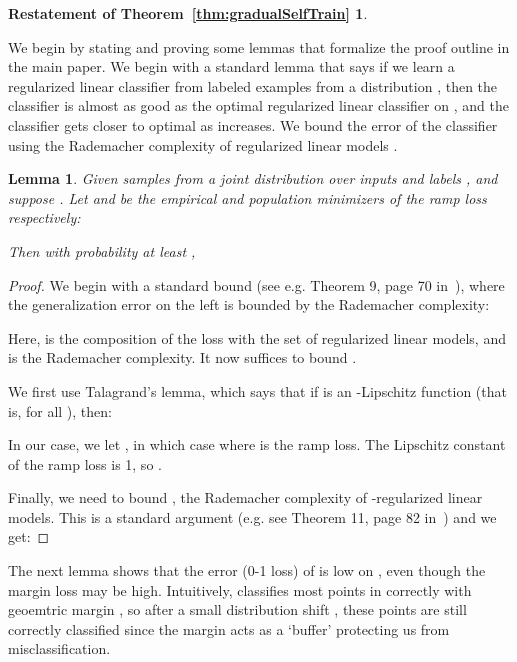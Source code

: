 \documentclass[11pt]{article}
\newtheorem{lemma}[theorem]{Lemma}
\begin{document}
\newtheorem*{gradualSelfTrainTheorem}{Restatement of Theorem~\ref{thm:gradualSelfTrain}}

\begin{gradualSelfTrainTheorem}
\gradualSelfTrainTheoremText{}
\end{gradualSelfTrainTheorem}

We begin by stating and proving some lemmas that formalize the proof outline in the main paper.
We begin with a standard lemma that says if we learn a regularized linear classifier from  labeled examples from a distribution , then the classifier is almost as good as the optimal regularized linear classifier on , and the classifier gets closer to optimal as  increases. We bound the error of the classifier using the Rademacher complexity of regularized linear models .

\begin{lemma}
\label{lem:finiteSampleBound}
Given  samples  from a joint distribution  over inputs  and labels , and suppose . Let  and  be the empirical and population minimizers of the ramp loss respectively:


Then with probability at least ,

\end{lemma}

\begin{proof}
We begin with a standard bound (see e.g. Theorem 9, page 70 in~\cite{liang2016statistical}), where the generalization error on the left is bounded by the Rademacher complexity:

Here,  is the composition of the loss with the set of regularized linear models, and  is the Rademacher complexity.
It now suffices to bound .

We first use Talagrand's lemma, which says that if  is an -Lipschitz function (that is,  for all ), then:

In our case, we let , in which case  where  is the ramp loss.
The Lipschitz constant of the ramp loss  is 1, so .

Finally, we need to bound , the Rademacher complexity of -regularized linear models. This is a standard argument (e.g. see Theorem 11, page 82 in~\cite{liang2016statistical}) and we get:

\end{proof}


The next lemma shows that the error (0-1 loss) of  is low on , even though the margin loss may be high. Intuitively,  classifies most points in  correctly with geoemtric margin , so after a small distribution shift , these points are still correctly classified since the margin acts as a `buffer' protecting us from misclassification.
\end{document}
